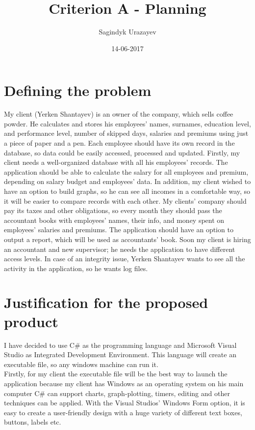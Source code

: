 \documentclass[a4]{article}
\title{Criterion A - Planning}
\author{Sagindyk Urazayev}
\date{14-06-2017}
\begin{document}
\maketitle

\newpage

\section{Defining the problem}

My client (Yerken Shantayev) is an owner of the company, which sells coffee powder. He calculates and stores his employees’ names, surnames, education level, and performance level, number of skipped days, salaries and premiums using just a piece of paper and a pen. Each employee should have its own record in the database, so data could be easily accessed, processed and updated. Firstly, my client needs a well-organized database with all his employees’ records. The application should be able to calculate the salary for all employees and premium, depending on salary budget and employees’ data. In addition, my client wished to have an option to build graphs, so he can see all incomes in a comfortable way, so it will be easier to compare records with each other. My clients’ company should pay its taxes and other obligations, so every month they should pass the accountant books with employees’ names, their info, and money spent on employees’ salaries and premiums. The application should have an option to output a report, which will be used as accountants’ book. Soon my client is hiring an accountant and new supervisor; he needs the application to have different access levels. In case of an integrity issue, Yerken Shantayev wants to see all the activity in the application, so he wants log files.

\section{Justification for the proposed product}

I have decided to use C\# as the programming language and Microsoft Visual Studio as Integrated Development Environment. This language will create an executable file, so any windows machine can run it.\\

Firstly, for my client the executable file will be the best way to launch the application because my client has Windows as an operating system on his main computer C\# can support charts, graph-plotting, timers, editing and other techniques can be applied. With the Visual Studios’ Windows Form option, it is easy to create a user-friendly design with a huge variety of different text boxes, buttons, labels etc. \\
\end{document}
